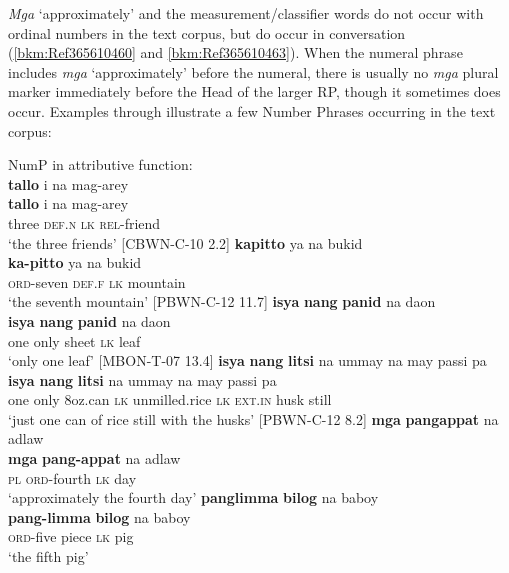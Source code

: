 \textit{Mga} ‘approximately’ and the measurement/classifier words do not occur with ordinal numbers in the text corpus, but do occur in conversation (\ref{bkm:Ref365610460} and \ref{bkm:Ref365610463}). When the numeral phrase includes \textit{mga} ‘approximately’ before the numeral, there is usually no \textit{mga} plural marker immediately before the Head of the larger RP, though it sometimes does occur. Examples  through  illustrate a few Number Phrases occurring in the text corpus:

\ea
\label{bkm:Ref117598318}
NumP in attributive function: \\
\textbf{tallo}  i  na  mag-arey \\\smallskip
 \gll \textbf{tallo}  i  na  mag-arey \\
three  \textsc{def.n}  \textsc{lk}  \textsc{rel}-friend \\
\glt ‘the three friends’ [CBWN-C-10 2.2]
\z
\ea
\label{bkm:Ref117598320}
\textbf{kapitto}   ya  na  bukid \\\smallskip
 \gll \textbf{ka-pitto}   ya  na  bukid \\
\textsc{ord-}seven  \textsc{def.f}  \textsc{lk}  mountain \\
\glt ‘the seventh mountain’ [PBWN-C-12 11.7]
\z
\ea
\textbf{isya}  \textbf{nang}  \textbf{panid}   na  daon \\\smallskip
 \gll \textbf{isya}  \textbf{nang}  \textbf{panid}   na  daon \\
one  only  sheet  \textsc{lk}  leaf \\
\glt ‘only one leaf’ [MBON-T-07 13.4]
\z
\ea
\textbf{isya}  \textbf{nang}  \textbf{litsi}     na  ummay  na  may  passi  pa \\\smallskip
 \gll \textbf{isya}  \textbf{nang}  \textbf{litsi}     na  ummay  na  may  passi  pa \\
one  only  8oz.can  \textsc{lk}  unmilled.rice  \textsc{lk}  \textsc{ext.in}  husk  still \\
\glt ‘just one can of rice still with the husks’ [PBWN-C-12 8.2]
\z
\ea
\label{bkm:Ref365610460}
\textbf{mga}  \textbf{pangappat}   na  adlaw \\\smallskip
 \gll \textbf{mga}  \textbf{pang-appat}   na  adlaw \\
\textsc{pl}  \textsc{ord}-fourth  \textsc{lk}  day \\
\glt ‘approximately the fourth day’
\z
\ea
\label{bkm:Ref365610463}
\textbf{panglimma}  \textbf{bilog}   na  baboy \\\smallskip
 \gll \textbf{pang-limma}  \textbf{bilog}   na  baboy \\
\textsc{ord}-five  piece   \textsc{lk}  pig \\
\glt ‘the fifth pig’
\z


